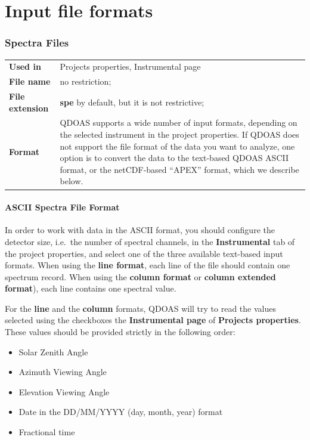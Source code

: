 \chapter{Input file formats}\label{cha:input-files-format}

\subsection{Spectra Files}\hfill
\begin{minipage}[t]{\textwidth}
\vspace{-0.6\baselineskip}
\begin{tabular}[h]{l p{8cm}}
\textbf{Used in} & Projects properties, Instrumental page \\ [6pt]
\textbf{File name} & no restriction; \\ [6pt]
\textbf{File extension} & \textbf{spe} by default, but it is not restrictive;  \\ [6pt]
\textbf{Format} & QDOAS supports a wide number of input formats, depending on the selected instrument in the project properties.  If QDOAS does not support the file format of the data you want to analyze, one option is to convert the data to the text-based QDOAS ASCII format, or the netCDF-based ``APEX'' format, which we describe below.\\  [6pt]
\end{tabular}
\end{minipage}

\subsubsection{ASCII Spectra File Format}
In order to work with data in the ASCII format, you should configure the detector size, i.e.\ the number of spectral channels, in the \textbf{Instrumental} tab of the project properties, and select one of the three available text-based input formats.  When using the \textbf{line format}, each line of the file should contain one spectrum record.   When using the \textbf{column format} or \textbf{column extended format}), each line contains one spectral value.

For the \textbf{line} and the \textbf{column} formats, QDOAS will try to read the values selected using the checkboxes the \textbf{Instrumental page} of \textbf{Projects properties}.  These values should be provided strictly in the following order:
\begin{itemize} \itemsep -6pt
\item Solar Zenith Angle
\item Azimuth Viewing Angle
\item Elevation Viewing Angle
\item Date in the DD/MM/YYYY (day, month, year) format
\item Fractional time
\end{itemize}

